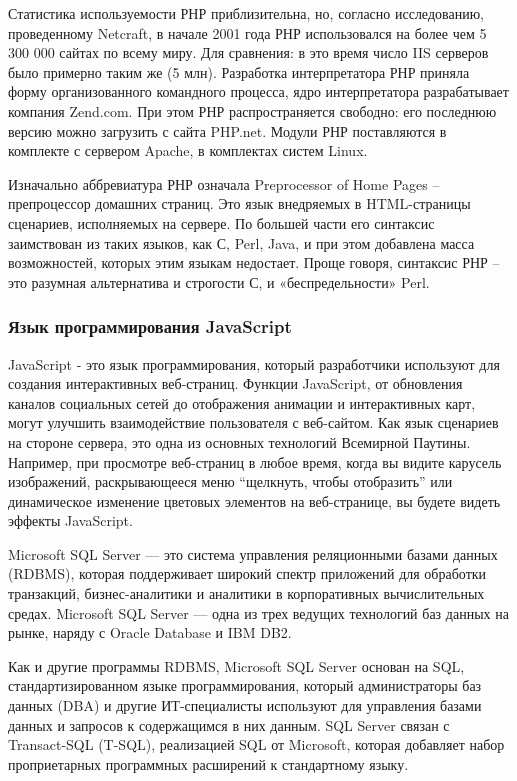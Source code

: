 Статистика используемости РНР приблизительна, но, согласно исследованию, проведенному Netcraft, в начале 2001 года РНР использовался на более чем 5 300 000 сайтах по всему миру. Для сравнения: в это время число IIS серверов было примерно таким же (5 млн). Разработка интерпретатора РНР приняла форму организованного командного процесса, ядро интерпретатора разрабатывает компания Zend.com. При этом РНР распространяется свободно: его последнюю версию можно загрузить с сайта PHP.net. Модули РНР поставляются в комплекте с сервером Apache, в комплектах систем Linux.

Изначально аббревиатура РНР означала Preprocessor of Home Pages -- препроцессор домашних страниц. Это язык внедряемых в HTML-страницы сценариев, исполняемых на сервере. По большей части его синтаксис заимствован из таких языков, как С, Perl, Java, и при этом добавлена масса возможностей, которых этим языкам недостает. Проще говоря, синтаксис РНР -- это разумная альтернатива и строгости С, и «беспредельности» Perl.


\subsubsection{Язык программирования JavaScript}

JavaScript - это язык программирования, который разработчики используют для создания интерактивных веб-страниц. Функции JavaScript, от обновления каналов социальных сетей до отображения анимации и интерактивных карт, могут улучшить взаимодействие пользователя с веб-сайтом. Как язык сценариев на стороне сервера, это одна из основных технологий Всемирной Паутины. Например, при просмотре веб-страниц в любое время, когда вы видите карусель изображений, раскрывающееся меню “щелкнуть, чтобы отобразить” или динамическое изменение цветовых элементов на веб-странице, вы будете видеть эффекты JavaScript.

Microsoft SQL Server — это система управления реляционными базами данных (RDBMS), которая поддерживает широкий спектр приложений для обработки транзакций, бизнес-аналитики и аналитики в корпоративных вычислительных средах. Microsoft SQL Server — одна из трех ведущих технологий баз данных на рынке, наряду с Oracle Database и IBM DB2.

Как и другие программы RDBMS, Microsoft SQL Server основан на SQL, стандартизированном языке программирования, который администраторы баз данных (DBA) и другие ИТ-специалисты используют для управления базами данных и запросов к содержащимся в них данным. SQL Server связан с Transact-SQL (T-SQL), реализацией SQL от Microsoft, которая добавляет набор проприетарных программных расширений к стандартному языку.

